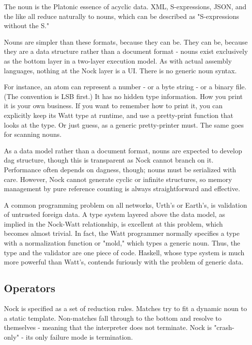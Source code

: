 \documentclass[10pt, nocopyrightspace]{sigplanconf}
\begin{document}
The noun is the Platonic essence of acyclic data.  XML,
S-expressions, JSON, and the like all reduce naturally to 
nouns, which can be described as "S-expressions without the S."

Nouns are simpler than these formats, because they can be.  They
can be, because they are a data structure rather than a document
format - nouns exist exclusively as the bottom layer in a
two-layer execution model.  As with actual assembly
languages, nothing at the Nock layer is a UI.  There is no
generic noun syntax.

For instance, an atom can represent a number - or a byte string
- or a binary file. (The convention is LSB first.)  It has no
hidden type information.  How you print it is your own business.
If you want to remember how to print it, you can explicitly keep
its Watt type at runtime, and use a pretty-print function that
looks at the type.  Or just guess, as a generic pretty-printer
must.  The same goes for scanning nouns.

As a data model rather than a document format, nouns are expected
to develop dag structure, though this is transparent as Nock
cannot branch on it.  Performance often depends on dagness,
though; nouns must be serialized with care.  However, Nock cannot
generate cyclic or infinite structures, so memory management by
pure reference counting is always straightforward and effective.

A common programming problem on all networks, Urth's or Earth's,
is validation of untrusted foreign data.  A type system layered
above the data model, as implied in the Nock-Watt relationship,
is excellent at this problem, which becomes almost trivial.  In
fact, the Watt programmer normally specifies a type with a
normalization function or "mold," which types a generic noun.
Thus, the type and the validator are one piece of code.  Haskell,
whose type system is much more powerful than Watt's, contends
furiously with the problem of generic data.

\subsection{Operators}

Nock is specified as a set of reduction rules.  Matches try to
fit a dynamic noun to a static template.  Non-matches fall
through to the bottom and resolve to themselves - meaning that
the interpreter does not terminate.  Nock is "crash-only"
\citep{crashonly} -
its only failure mode is termination.
\end{document}
